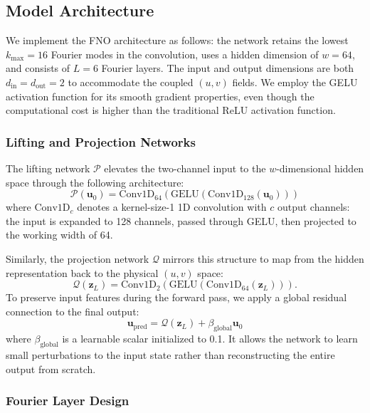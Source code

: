 \documentclass[runningheads]{llncs}
\begin{document}
\subsection{Model Architecture}
\label{sec:model_architecture}

We implement the FNO architecture as follows: the network retains the lowest $k_{\max} = 16$ Fourier modes in the convolution, uses a hidden dimension of $w = 64$, and consists of $L = 6$ Fourier layers. The input and output dimensions are both $d_{\text{in}} = d_{\text{out}} = 2$ to accommodate the coupled $(u, v)$ fields. We employ the GELU activation function for its smooth gradient properties, even though the computational cost is higher than the traditional ReLU activation function.


\subsubsection{Lifting and Projection Networks}
\label{sec:lifting_projection}

The lifting network $\mathcal{P}$ elevates the two-channel input to the $w$-dimensional hidden space through the following architecture:
\begin{equation*}
    \mathcal{P}(\bm{u}_0) = \text{Conv1D}_{64}\left(\text{GELU}\left(\text{Conv1D}_{128}(\bm{u}_0)\right)\right)
\end{equation*}
where $\text{Conv1D}_c$ denotes a kernel-size-1 1D convolution with $c$ output channels: the input is expanded to 128 channels, passed through GELU, then projected to the working width of 64.

Similarly, the projection network $\mathcal{Q}$ mirrors this structure to map from the hidden representation back to the physical $(u, v)$ space:
\begin{equation*}
    \mathcal{Q}(\bm{z}_L) = \text{Conv1D}_{2}\left(\text{GELU}\left(\text{Conv1D}_{64}(\bm{z}_L)\right)\right).
\end{equation*}
To preserve input features during the forward pass, we apply a global residual connection to the final output:
\begin{equation*}
    \bm{u}_{\text{pred}} = \mathcal{Q}(\bm{z}_L) + \beta_{\text{global}} \bm{u}_0
\end{equation*}
where $\beta_{\text{global}}$ is a learnable scalar initialized to 0.1. It allows the network to learn small perturbations to the input state rather than reconstructing the entire output from scratch.


\subsubsection{Fourier Layer Design}
\label{sec:fourier_layer_design}
\end{document}
